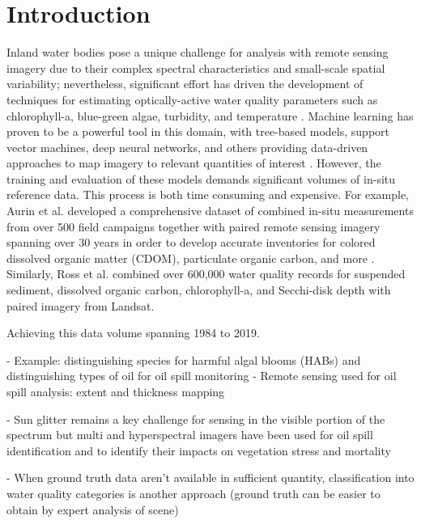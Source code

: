 \documentclass[remotesensing,article,submit,pdftex,moreauthors]{Definitions/mdpi}
\begin{document}
\section{Introduction}

Inland water bodies pose a unique challenge for analysis with remote sensing imagery due to their complex spectral characteristics and small-scale spatial variability; nevertheless, significant effort has driven the development of techniques for estimating optically-active water quality parameters such as chlorophyll-a, blue-green algae, turbidity, and temperature \cite{ritchie2003remote, bonansea2015using}. Machine learning has proven to be a powerful tool in this domain, with tree-based models, support vector machines, deep neural networks, and others providing data-driven approaches to map imagery to relevant quantities of interest \cite{thenkabail2018hyperspectral, ghatkar2019classification,sagan2020monitoring}. However, the training and evaluation of these models demands significant volumes of in-situ reference data. This process is both time consuming and expensive. For example, Aurin et al. developed a comprehensive dataset of combined in-situ measurements from over 500 field campaigns together with paired remote sensing imagery spanning over 30 years in order to develop accurate inventories for colored dissolved organic matter (CDOM), particulate organic carbon, and more \cite{aurin2018remote}. Similarly, Ross et al. combined over 600,000 water quality records for suspended sediment, dissolved organic carbon, chlorophyll-a, and Secchi-disk depth with paired imagery from Landsat.

Achieving this data volume 
spanning 1984 to 2019. 

- Example: distinguishing species for harmful algal blooms (HABs) and distinguishing types of oil for oil spill monitoring
- Remote sensing used for oil spill analysis: extent and thickness mapping \cite{kokaly2013spectroscopic, leifer2012state}

- Sun glitter remains a key challenge for sensing in the visible portion of the spectrum but multi and hyperspectral imagers have been used for oil spill identification and to identify their impacts on vegetation stress and mortality \cite{fingas2014review, khan2018modern}


- When ground truth data aren't available in sufficient quantity, classification into water quality categories is another approach (ground truth can be easier to obtain by expert analysis of scene) \cite{koponen2002lake}
\end{document}
